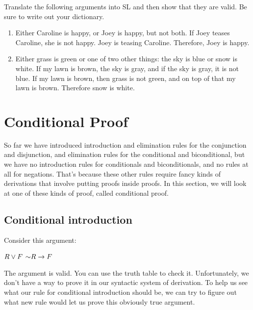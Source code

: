 \noindent\problempart
Translate the following arguments into SL and then show that they are valid. Be sure to write out your dictionary. 
\begin{enumerate}[label=(\arabic*)]

\item Either Caroline is happy, or Joey is happy, but not both. If Joey teases Caroline, she is not happy. Joey is teasing Caroline. Therefore, Joey is happy.

%

\item Either grass is green or one of two other things: the sky is blue or snow is white. If my lawn is brown, the sky is gray, and if the sky is gray, it is not blue. If my lawn is brown, then grass is not green, and on top of that my lawn is brown. Therefore snow is white.

\end{enumerate}

\section{Conditional Proof}
\setlength{\parindent}{1em}

So far we have introduced introduction and elimination rules for the conjunction and disjunction, and elimination rules for the conditional and biconditional, but we have no introduction rules for conditionals and biconditionals, and no rules at all for negations. That's because these other rules require fancy kinds of derivations that involve putting proofs inside proofs. In this section, we will look at one of these kinds of proof, called conditional proof.


\subsection{Conditional introduction}
Consider this argument:
\begin{earg*}
\item $R \vee F$
\itemc[.15] $\mathord{\sim} R \rightarrow F$
\end{earg*}
The argument is valid. You can use the truth table to check it. Unfortunately, we don't have a way to prove it in our syntactic system of derivation. To help us see what our rule for conditional introduction should be, we can try to figure out what new rule would let us prove this obviously true argument.

